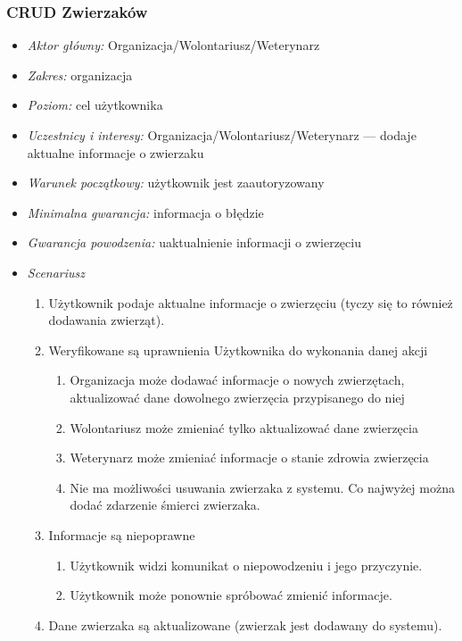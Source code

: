 \documentclass[10pt,a4paper]{article}
\begin{document}
\subsubsection{CRUD Zwierzaków}
\begin{itemize}
	\item \emph{Aktor główny:} Organizacja/Wolontariusz/Weterynarz
	\item \emph{Zakres:} organizacja
	\item \emph{Poziom:} cel użytkownika
	\item \emph{Uczestnicy i interesy:} 
		Organizacja/Wolontariusz/Weterynarz --- dodaje aktualne informacje o zwierzaku
	\item \emph{Warunek początkowy:} użytkownik jest zaautoryzowany
	\item \emph{Minimalna gwarancja:} informacja o błędzie
	\item \emph{Gwarancja powodzenia:} uaktualnienie informacji o zwierzęciu
	\item \emph{Scenariusz}
	\begin{enumerate}
		\item Użytkownik podaje aktualne informacje o zwierzęciu (tyczy się to również dodawania zwierząt).
		\item Weryfikowane są uprawnienia Użytkownika do wykonania danej akcji
		\begin{enumerate}
			\item Organizacja może dodawać informacje o nowych zwierzętach, aktualizować dane dowolnego zwierzęcia przypisanego do niej
			\item Wolontariusz może zmieniać tylko aktualizować dane zwierzęcia
			\item Weterynarz może zmieniać informacje o stanie zdrowia zwierzęcia
			\item Nie ma możliwości usuwania zwierzaka z systemu. Co najwyżej można dodać zdarzenie śmierci zwierzaka.
		\end{enumerate}
		\item Informacje są niepoprawne
		\begin{enumerate}
			\item Użytkownik widzi komunikat o niepowodzeniu i jego przyczynie.
			\item Użytkownik może ponownie spróbować zmienić informacje.
		\end{enumerate}
		\item Dane zwierzaka są aktualizowane (zwierzak jest dodawany do systemu).
	\end{enumerate}
\end{itemize}
\end{document}
